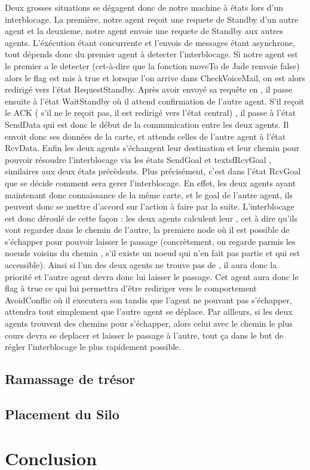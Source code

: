 \documentclass[11pt]{article}
\begin{document}
Deux grosses situations se dégagent donc de notre machine à états lors d'un interblocage. La première, notre agent reçoit une requete de Standby d'un autre agent et la deuxieme, notre agent envoie une requete de Standby aux autres agents. L'éxécution étant concurrente et l'envois de messages étant asynchrone, tout dépends donc du premier agent à detecter l'interblocage. Si notre agent est le premier a le detecter (cet-à-dire que la fonction moveTo de Jade renvoie false) alors le flag  est mis à true et lorsque l'on arrive dans \textsf{CheckVoiceMail}, on est alors redirigé vers l'état \textsf{RequestStandby}. Après avoir envoyé sa requête en , il passe ensuite à l'état \textsf{WaitStandby} où il attend confirmation de l'autre agent. S'il reçoit le ACK ( s'il ne le reçoit pas, il est redirigé vers l'état central) , il passe à l'état \textsf{SendData} qui est donc le début de la communication entre les deux agents. Il envoit donc ses données de la carte, et attends celles de l'autre agent à l'état \textsf{RcvData}. Enfin les deux agents s'échangent leur destination et leur chemin pour pouvoir résoudre l'interblocage via les états \textsf{SendGoal} et textsf{RcvGoal} , similaires aux deux états précèdents. Plus précisément, c'est dans l'état \textsf{RcvGoal} que se décide comment sera gerer l'interblocage. En effet, les deux agents ayant maintenant donc connaissance de la même carte, et le goal de l'autre agent, ils peuvent donc se mettre d'accord sur l'action à faire par la suite. L'interblocage est donc déroulé de cette façon : les deux agents calculent leur , cet à dire qu'ils vont regarder dans le chemin de l'autre, la premiere node où il est possible de s'échapper pour pouvoir laisser le passage (concrètement, on regarde parmis les noeuds voisins du chemin , s'il existe un noeud qui n'en fait pas partie et qui est accessible). Ainsi si l'un des deux agents ne trouve pas de , il aura donc la priorité et l'autre agent devra donc lui laisser le passage. Cet agent aura donc le flag  à true ce qui lui permettra d'être rediriger vers le comportement \textsf{AvoidConflic} où il executera son  tandis que l'agent ne pouvant pas s'échapper, attendra tout simplement que l'autre agent se déplace. Par ailleurs, si les deux agents trouvent des chemins pour s'échapper, alors celui avec le chemin le plus cours devra se deplacer et laisser le passage à l'autre, tout ça dans le but de régler l'interblocage le plus rapidement possible.

\subsection{Ramassage de trésor}
\subsection{Placement du Silo}
\section{Conclusion}
\end{document}
